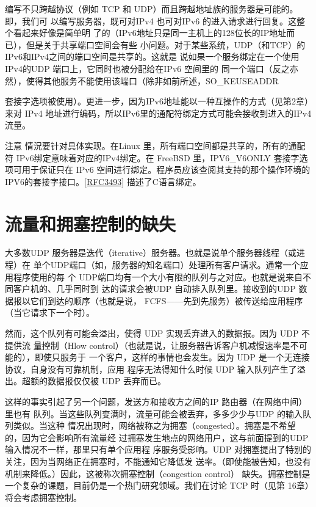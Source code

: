 编写不只跨越协议（例如 TCP 和 UDP）而且跨越地址族的服务器是可能的。即，我们可
以编写服务器，既可对IPv4 也可对IPv6 的进入请求进行回复。这整个看起来好像是简单明
了的（IPv6地址只是同一主机上的128位长的IP地址而已），但是关于共享端口空间会有些
小问题。对于某些系统，UDP（和TCP）的IPv6和IPv4之间的端口空间是共享的。这就是
说如果一个服务绑定在一个使用IPv4的UDP 端口上，它同时也被分配给在IPv6 空间里的
同一个端口（反之亦然），使得其他服务不能使用该端口（除非如前所述，SO\_KEUSEADDR

套接字选项被使用）。更进一步，因为IPv6地址能以一种互操作的方式（见第2章）来对
IPv4 地址进行编码，所以IPv6里的通配符绑定方式可能会接收到进入的IPv4流量。

注意 情況要针对具体实现。在Linux 里，所有端口空间都是共享的，所有的通配
符 IPv6绑定意味着对应的IPv4绑定。在 FreeBSD 里，IPV6\_V6ONLY 套接字选
项可用于保证只在 IPv6 空间进行绑定。程序员应该查阅其支持的那个操作环境的
IPV6的套接字接口。\href{https://www.rfc-editor.org/rfc/rfc3493}{[RFC3493]} 描述了C语言绑定。

\section{流量和拥塞控制的缺失}

大多数UDP 服务器是迭代（iterative）服务器。也就是说单个服务器线程（或进程）在
单个UDP端口（如，服务器的知名端口）处理所有客户请求。通常一个应用程序使用的每
个 UDP端口均有一个大小有限的队列与之对应。也就是说来自不同客户机的、几乎同时到
达的请求会被UDP 自动排入队列里。接收到的UDP 数据报以它们到达的顺序（也就是说，
FCFS——先到先服务）被传送给应用程序（当它请求下一个时）。

然而，这个队列有可能会溢出，使得 UDP 实现丢弃进入的数据报。因为 UDP 不提供流
量控制（Hlow control）（也就是说，让服务器告诉客户机减慢速率是不可能的），即使只服务于
一个客户，这样的事情也会发生。因为 UDP 是一个无连接协议，自身没有可靠机制，应用
程序无法得知什么时候 UDP 输入队列产生了溢出。超额的数据报仅仅被 UDP 丢弃而已。

这样的事实引起了另一个问题，发送方和接收方之间的IP 路由器（在网络中间）里也有
队列。当这些队列变满时，流量可能会被丢弃，多多少少与UDP 的输入队列类似。当这种
情况出现时，网络被称之为拥塞（congested）。拥塞是不希望的，因为它会影响所有流量经
过拥塞发生地点的网络用户，这与前面提到的UDP 输入情况不一样，那里只有单个应用程
序服务受影响。UDP 对拥塞提出了特别的关注，因为当网络正在拥塞时，不能通知它降低发
送率。（即使能被告知，也没有机制来降低。）因此，这被称次拥塞控制（congestion control）
缺失。拥塞控制是一个复杂的课题，目前仍是一个热门研究领域。我们在讨论 TCP 时（见第
16章）将会考虑拥塞控制。

